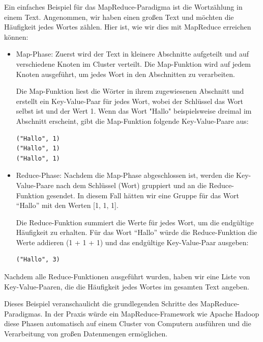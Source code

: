 Ein einfaches Beispiel für das MapReduce-Paradigma ist die Wortzählung in einem Text. Angenommen, wir haben einen großen Text und möchten die Häufigkeit jedes Wortes zählen. Hier ist, wie wir dies mit MapReduce erreichen können:
\begin{itemize} 
\item Map-Phase: Zuerst wird der Text in kleinere Abschnitte aufgeteilt und auf verschiedene Knoten im Cluster verteilt. Die Map-Funktion wird auf jedem Knoten ausgeführt, um jedes Wort in den Abschnitten zu verarbeiten.

Die Map-Funktion liest die Wörter in ihrem zugewiesenen Abschnitt und erstellt ein Key-Value-Paar für jedes Wort, wobei der Schlüssel das Wort selbst ist und der Wert 1. Wenn das Wort "Hallo" beispielsweise dreimal im Abschnitt erscheint, gibt die Map-Funktion folgende Key-Value-Paare aus:

\noindent\begin{minipage}{\textwidth}
\begin{lstlisting}[caption={Ausgabe},captionpos=b,label={lst:map}]
("Hallo", 1)
("Hallo", 1)
("Hallo", 1)
\end{lstlisting}
\end{minipage}

\item Reduce-Phase: Nachdem die Map-Phase abgeschlossen ist, werden die Key-Value-Paare nach dem Schlüssel (Wort) gruppiert und an die Reduce-Funktion gesendet. In diesem Fall hätten wir eine Gruppe für das Wort \enquote{Hallo} mit den Werten [1, 1, 1].

Die Reduce-Funktion summiert die Werte für jedes Wort, um die endgültige Häufigkeit zu erhalten. Für das Wort \enquote{Hallo} würde die Reduce-Funktion die Werte addieren (1 + 1 + 1) und das endgültige Key-Value-Paar ausgeben:
\noindent\begin{minipage}{\textwidth}
\begin{lstlisting}[caption={Ausgabe},captionpos=b,label={lst:map}]
("Hallo", 3)
\end{lstlisting}
\end{minipage}
\end{itemize}  

Nachdem alle Reduce-Funktionen ausgeführt wurden, haben wir eine Liste von Key-Value-Paaren, die die Häufigkeit jedes Wortes im gesamten Text angeben.

Dieses Beispiel veranschaulicht die grundlegenden Schritte des MapReduce-Paradigmas. In der Praxis würde ein MapReduce-Framework wie Apache Hadoop diese Phasen automatisch auf einem Cluster von Computern ausführen und die Verarbeitung von großen Datenmengen ermöglichen.
